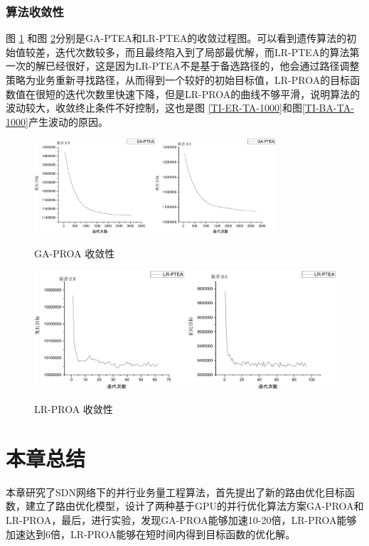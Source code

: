 \subsubsection{算法收敛性}
图 \ref{GA-CO} 和图 \ref{LR-CO}分别是GA-PTEA和LR-PTEA的收敛过程图。可以看到遗传算法的初始值较差，迭代次数较多，而且最终陷入到了局部最优解，而LR-PTEA的算法第一次的解已经很好，这是因为LR-PTEA不是基于备选路径的，他会通过路径调整策略为业务重新寻找路径，从而得到一个较好的初始目标值，LR-PROA的目标函数值在很短的迭代次数里快速下降，但是LR-PROA的曲线不够平滑，说明算法的波动较大，收敛终止条件不好控制，这也是图 \ref{TI-ER-TA-1000}和图\ref{TI-BA-TA-1000}产生波动的原因。
\begin{figure}
\setlength{\belowcaptionskip}{-0.1cm}
\begin{center}
{\includegraphics[width=0.8\textwidth]{figures/GA-CO.pdf}}
\end{center}
\caption{{\footnotesize{GA-PROA 收敛性}}}
\label{GA-CO}
\end{figure}
\begin{figure}
\setlength{\belowcaptionskip}{-0.1cm}
\begin{center}
{\includegraphics[width=0.8 \textwidth]{figures/LR-CO.pdf}}
\end{center}
\caption{{\footnotesize{LR-PROA 收敛性}}}
\label{LR-CO}
\end{figure}
\section{本章总结}
本章研究了SDN网络下的并行业务量工程算法，首先提出了新的路由优化目标函数，建立了路由优化模型，设计了两种基于GPU的并行优化算法方案GA-PROA和LR-PROA，最后，进行实验，发现GA-PROA能够加速10-20倍，LR-PROA能够加速达到6倍，LR-PROA能够在短时间内得到目标函数的优化解。








